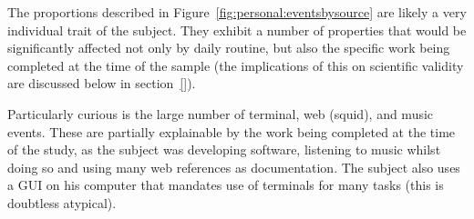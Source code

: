The proportions described in Figure~\ref{fig:personal:eventsbysource} are likely a very individual trait of the subject.  They exhibit a number of properties that would be significantly affected not only by daily routine, but also the specific work being completed at the time of the sample (the implications of this on scientific validity are discussed below in section~\ref{}).

Particularly curious is the large number of terminal, web (squid), and music events.  These are partially explainable by the work being completed at the time of the study, as the subject was developing software, listening to music whilst doing so and using many web references as documentation.  The subject also uses a GUI on his computer that mandates use of terminals for many tasks (this is doubtless atypical).



